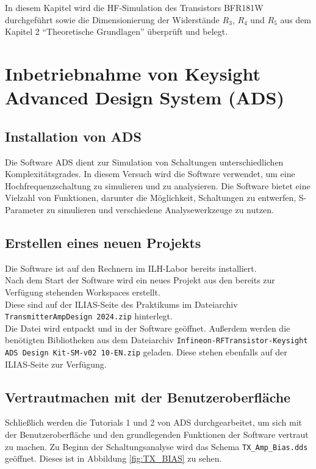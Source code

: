 In diesem Kapitel wird die \ac{HF}-Simulation des Transistors BFR181W durchgeführt sowie die Dimensionierung der Widerstände $R_3$, $R_4$ und $R_5$ aus dem Kapitel 2 \enquote{Theoretische Grundlagen} überprüft und belegt.

\section{Inbetriebnahme von Keysight Advanced Design System (ADS)}
\subsection{Installation von ADS}
Die Software \ac{ADS} dient zur Simulation von Schaltungen unterschiedlichen Komplexitätsgrades. 
In diesem Versuch wird die Software verwendet, um eine Hochfrequenzschaltung zu simulieren und zu analysieren. 
Die Software bietet eine Vielzahl von Funktionen, darunter die Möglichkeit, Schaltungen zu entwerfen, S-Parameter zu simulieren und verschiedene Analysewerkzeuge zu nutzen.

\subsection{Erstellen eines neuen Projekts}
Die Software ist auf den Rechnern im ILH-Labor bereits installiert.\\
Nach dem Start der Software wird ein neues Projekt aus den bereits zur Verfügung stehenden Workspaces erstellt.\\
Diese sind auf der ILIAS-Seite des Praktikums im Dateiarchiv \texttt{TransmitterAmpDesign 2024.zip} hinterlegt.\\
Die Datei wird entpackt und in der Software geöffnet. Außerdem werden die benötigten Bibliotheken aus dem Dateiarchiv \texttt{Infineon-RFTransistor-Keysight ADS Design Kit-SM-v02 10-EN.zip} geladen. Diese stehen ebenfalls auf der ILIAS-Seite zur Verfügung.

\subsection{Vertrautmachen mit der Benutzeroberfläche}
Schließlich werden die Tutorials 1 und 2 von \ac{ADS} durchgearbeitet, um sich mit der Benutzeroberfläche und den grundlegenden Funktionen der Software vertraut zu machen.
Zu Beginn der Schaltungsanalyse wird das Schema \texttt{TX\_Amp\_Bias.dds} geöffnet. Dieses ist in Abbildung \ref{fig:TX_BIAS} zu sehen.

